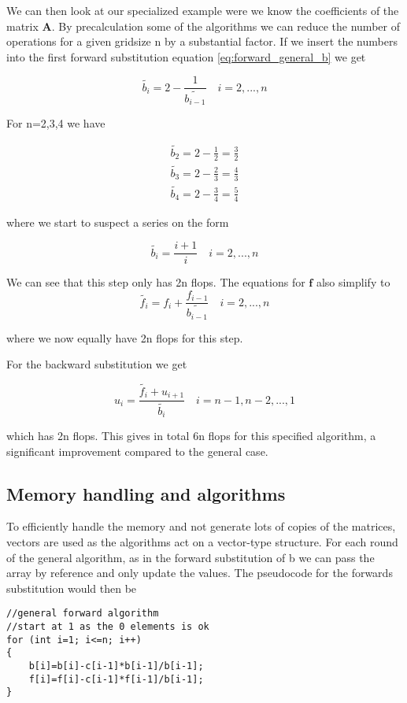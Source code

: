 \documentclass[a4paper,11pt]{article}
\begin{document}
{We can then look at our specialized example were we know the coefficients of the matrix $\mathbf{A}$. By precalculation some of the algorithms we can reduce the number of operations for a given gridsize n by a substantial factor. If we insert the numbers into the first forward substitution equation \ref{eq:forward_general_b} we get

\begin{equation}
	\tilde{b_i}=2-\frac{1}{\tilde{b_{i-1}}}\quad i = 2, ..., n
\end{equation}

For n=2,3,4 we have 

\begin{align}
	\tilde{b_2}=2-\frac{1}{2}=\frac{3}{2} \\
	\tilde{b_3}=2-\frac{2}{3}=\frac{4}{3} \\
	\tilde{b_4}=2-\frac{3}{4}=\frac{5}{4}
\end{align}

where we start to suspect a series on the form

\begin{equation}
	\tilde{b_i}=\frac{i+1}{i}  \quad i = 2, ..., n
	\label{eq:forward_specific_b}
\end{equation}

We can see that this step only has 2n flops. The equations for $\mathbf{f}$ also simplify to
\begin{equation}
	\tilde{f_i}=f_{i}+\frac{f_{i-1}}{\tilde{b_{i-1}}}\quad i = 2, ..., n
	\label{eq:forward_specific_f}
\end{equation}

where we now equally have 2n flops for this step. 

For the backward substitution we get 

\begin{equation}
	u_i = \frac{\tilde{f_i} + u_{i+1}}{\tilde{b_i}}\quad i = n-1, n-2, ..., 1
	\label{eq:forward_specific_u}
\end{equation}

which has 2n flops. 
This gives in total 6n flops for this specified algorithm, a significant improvement compared to the general case. 

\subsection{Memory handling and algorithms}
To efficiently handle the memory and not generate lots of copies of the matrices, vectors are used as the algorithms act on a vector-type structure. For each round of the general algorithm, as in the forward substitution of b we can pass the array by reference and only update the values. The pseudocode for the forwards substitution would then be
\begin{lstlisting}
//general forward algorithm
//start at 1 as the 0 elements is ok
for (int i=1; i<=n; i++)
{
	b[i]=b[i]-c[i-1]*b[i-1]/b[i-1];
	f[i]=f[i]-c[i-1]*f[i-1]/b[i-1];
}
\end{lstlisting}

}
\end{document}
